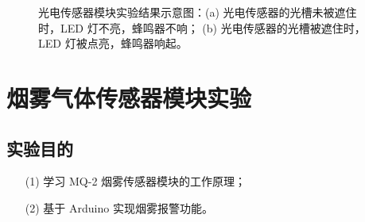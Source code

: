 \documentclass[UTF8, oneside]{ctexbook}
\begin{document}
\begin{figure}[h]
    \centering


    \centering
    \caption{光电传感器模块实验结果示意图：(a) 光电传感器的光槽未被遮住时，LED 灯不亮，蜂鸣器不响；
    (b) 光电传感器的光槽被遮住时，LED 灯被点亮，蜂鸣器响起。}
    \label{s23_1}
    
\end{figure}


\chapter{烟雾气体传感器模块实验}

\section{实验目的}
\begin{itemize}
    \item[(1)] 学习 MQ-2 烟雾传感器模块的工作原理；
    \item[(2)] 基于 Arduino 实现烟雾报警功能。
\end{itemize}
\end{document}
